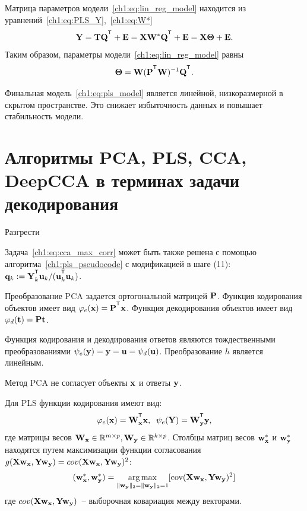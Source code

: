 Матрица параметров модели~\ref{ch1:eq:lin_reg_model} находится из уравнений~\eqref{ch1:eq:PLS_Y},~\eqref{ch1:eq:W*}
\begin{equation*}
	\bY = \bT \bQ^{\T} + \bE = \bX \bW^* \bQ^{\T} + \bE = \bX \bTheta + \bE.
	\label{ch1:eq:pls_model}
\end{equation*}
Таким образом, параметры модели~\eqref{ch1:eq:lin_reg_model} равны
\begin{equation}
	\bTheta = \bW (\bP^{\T} \bW)^{-1} \bQ^{\T}.
	\label{ch1:eq:linear_regression_model_parameters}
\end{equation}

Финальная модель~\eqref{ch1:eq:pls_model} является линейной, низкоразмерной в скрытом пространстве. 
Это снижает избыточность данных и повышает стабильность модели.

\hrulefill

\section{Алгоритмы PCA, PLS, CCA, DeepCCA в терминах задачи декодирования}

{\color{red} Разгрести}

Задача~\eqref{ch1:eq:cca_max_corr} может быть также решена с помощью алгоритма~\ref{ch1:pls_pseudocode} с модификацией в шаге (11): $\bq_k := \bY_k^{\T}\bu_k/(\bu_k^{\T}\bu_k)$.


\hrulefill

Преобразование PCA задается ортогональной матрицей $\mathbf{P}$. Функция кодирования объектов имеет вид $\varphi_e(\bx) = \bP^{\T}\bx$. Функция декодирования объектов имеет вид $\varphi_d(\mathbf{t}) = \mathbf{P}\mathbf{t}$. 

Функция кодирования и декодирования ответов являются тождественными преобразованиями $\psi_e(\mathbf{y}) =  \mathbf{y} = \mathbf{u} = \psi_d(\mathbf{u})$. Преобразование $h$ является линейным.

Метод PCA не согласует объекты $\mathbf{x}$ и ответы $\mathbf{y}$.


\hrulefill

Для PLS  функции кодирования имеют вид:
\begin{equation}
	\varphi_e(\bx) = \bW_{\bx}^{\T}\bx , \;\;
	\psi_e(\bY) = \bW_{\by}^{\T}\by ,
\end{equation} 
где матрицы весов $\mathbf{W}_{\mathbf{x}} \in \mathbb{R}^{m \times p}, \mathbf{W}_{\mathbf{y}} \in \mathbb{R}^{k \times p}$. Столбцы матриц весов $\mathbf{w}_{\mathbf{x}}^{*}$ и $\mathbf{w}_{\mathbf{y}}^{*}$ 
находятся путем максимизации функции согласования $g(\mathbf{X} \mathbf{w}_{\mathbf{x}}, \mathbf{Y} \mathbf{w}_{\mathbf{y}}) = cov (\mathbf{X} \mathbf{w}_{\mathbf{x}}, \mathbf{Y} \mathbf{w}_{\mathbf{y}})^{2}$:
\begin{equation}
	(\mathbf{w}_{\mathbf{x}}^{*}, \mathbf{w}_{\mathbf{y}}^{*}) = \mathop{\arg \max}\limits_{\|\mathbf{w}_{\mathbf{y}}\|_{2}=\|\mathbf{w}_{\mathbf{y}}\|_{2}=1}[\text{cov}(\mathbf{X} \mathbf{w}_{\mathbf{x}}, \mathbf{Y} \mathbf{w}_{\mathbf{y}})^{2}]
	\label{eq:PLSpr3}
\end{equation}
где $cov(\mathbf{X} \mathbf{w}_{\mathbf{x}}, \mathbf{Y} \mathbf{w}_{\mathbf{y}})$~-- выборочная ковариация между векторами.

